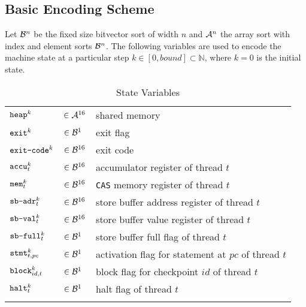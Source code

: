 
\subsection{Basic Encoding Scheme}

Let $\BVSORT[n]$ be the fixed size bitvector sort of width $n$ and $\ASORT[n]$ the array sort with index and element sorts $\BVSORT[n]$.
The following variables are used to encode the machine state at a particular step $k \in [0, bound] \subset \mathbb{N}$, where $k = 0$ is the initial state.

\setlength{\tabulinesep}{3pt}
\begin{longtabu}{llX}
  \firsthline
  $\HEAP^k$ & $\in \ASORT$ & shared memory \\
  $\EXIT^k$ & $\in \BVSORT[1]$ & exit flag \\
  $\EXITCODE^k$ & $\in \BVSORT$ & exit code \\
  \hline
  $\ACCU^k_t$ & $\in \BVSORT$ & accumulator register of thread $t$ \\
  $\MEM^k_t$ & $\in \BVSORT$ & \lstinline[language={[concubine]Assembler}]{CAS} memory register of thread $t$ \\
  $\SBADR^k_t$ & $\in \BVSORT$ & store buffer address register of thread $t$ \\
  $\SBVAL^k_t$ & $\in \BVSORT$ & store buffer value register of thread $t$ \\
  $\SBFULL^k_t$ & $\in \BVSORT[1]$ & store buffer full flag of thread $t$ \\
  $\STMT^k_{t, pc}$ & $\in \BVSORT[1]$ & activation flag for statement at $pc$ of thread $t$ \\
  $\BLOCK^k_{id, t}$ & $\in \BVSORT[1]$ & block flag for checkpoint $id$ of thread $t$ \\
  $\HALT^k_t$ & $\in \BVSORT[1]$ & halt flag of thread $t$ \\
  \lasthline
  \caption{State Variables}
  \label{tbl:states}
\end{longtabu}

\newcommand{\READ}{\texttt{read}}
\newcommand{\WRITE}{\texttt{write}}

